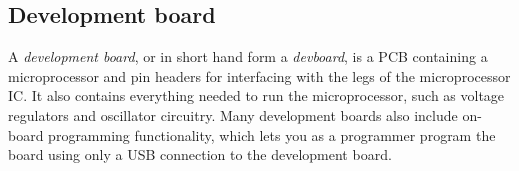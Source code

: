 \subsection{Development board}

A \textit{development board}, or in short hand form a \textit{devboard}, is a PCB containing a microprocessor and 
pin headers for interfacing with the legs of the microprocessor IC. 
It also contains everything needed to run the microprocessor, such as voltage regulators and oscillator circuitry.
Many development boards also include on-board programming functionality, which lets you as a programmer program 
the board using only a USB connection to the development board.
